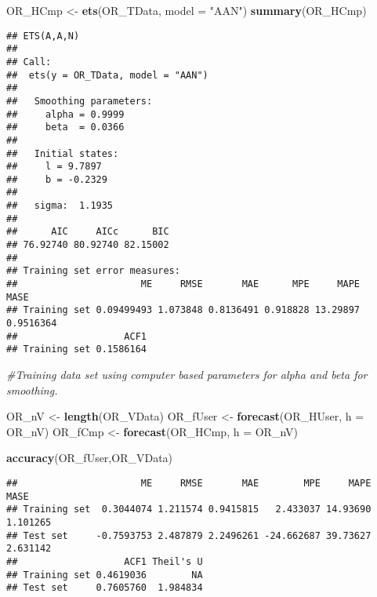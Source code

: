 \documentclass[
]{article}
\newenvironment{Shaded}{\begin{snugshade}}{\end{snugshade}}
\newcommand{\CommentTok}[1]{\textcolor[rgb]{0.56,0.35,0.01}{\textit{#1}}}
\newcommand{\DataTypeTok}[1]{\textcolor[rgb]{0.13,0.29,0.53}{#1}}
\newcommand{\KeywordTok}[1]{\textcolor[rgb]{0.13,0.29,0.53}{\textbf{#1}}}
\newcommand{\NormalTok}[1]{#1}
\newcommand{\StringTok}[1]{\textcolor[rgb]{0.31,0.60,0.02}{#1}}
\begin{document}
\begin{Shaded}
\begin{Highlighting}[]
\NormalTok{OR_HCmp <-}\StringTok{ }\KeywordTok{ets}\NormalTok{(OR_TData, }\DataTypeTok{model =} \StringTok{"AAN"}\NormalTok{)}
\KeywordTok{summary}\NormalTok{(OR_HCmp)}
\end{Highlighting}
\end{Shaded}

\begin{verbatim}
## ETS(A,A,N) 
## 
## Call:
##  ets(y = OR_TData, model = "AAN") 
## 
##   Smoothing parameters:
##     alpha = 0.9999 
##     beta  = 0.0366 
## 
##   Initial states:
##     l = 9.7897 
##     b = -0.2329 
## 
##   sigma:  1.1935
## 
##      AIC     AICc      BIC 
## 76.92740 80.92740 82.15002 
## 
## Training set error measures:
##                      ME     RMSE       MAE      MPE     MAPE      MASE
## Training set 0.09499493 1.073848 0.8136491 0.918828 13.29897 0.9516364
##                   ACF1
## Training set 0.1586164
\end{verbatim}

\begin{Shaded}
\begin{Highlighting}[]
\CommentTok{#Training data set using computer based parameters for alpha and beta for smoothing.}
\end{Highlighting}
\end{Shaded}

\begin{Shaded}
\begin{Highlighting}[]
\NormalTok{OR_nV <-}\StringTok{ }\KeywordTok{length}\NormalTok{(OR_VData)}
\NormalTok{OR_fUser <-}\StringTok{ }\KeywordTok{forecast}\NormalTok{(OR_HUser, }\DataTypeTok{h =}\NormalTok{ OR_nV)}
\NormalTok{OR_fCmp <-}\StringTok{ }\KeywordTok{forecast}\NormalTok{(OR_HCmp, }\DataTypeTok{h =}\NormalTok{ OR_nV)}
\end{Highlighting}
\end{Shaded}

\begin{Shaded}
\begin{Highlighting}[]
\KeywordTok{accuracy}\NormalTok{(OR_fUser,OR_VData)}
\end{Highlighting}
\end{Shaded}

\begin{verbatim}
##                      ME     RMSE       MAE        MPE     MAPE     MASE
## Training set  0.3044074 1.211574 0.9415815   2.433037 14.93690 1.101265
## Test set     -0.7593753 2.487879 2.2496261 -24.662687 39.73627 2.631142
##                   ACF1 Theil's U
## Training set 0.4619036        NA
## Test set     0.7605760  1.984834
\end{verbatim}
\end{document}
